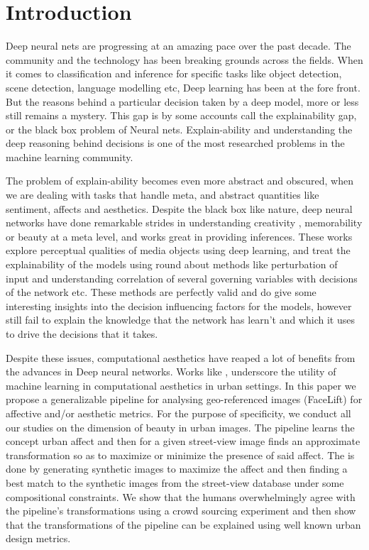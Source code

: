 \section{Introduction}

Deep neural nets are progressing at an amazing pace over the past decade. The community and the technology has been breaking grounds across the fields. 
When it comes to classification and inference for specific tasks like object detection, scene detection, language modelling etc, Deep learning has been at the fore front. 
But the  reasons behind a particular decision taken by a deep model, more or less still remains a mystery. This gap is by some accounts call the explainability gap, or the black box problem of Neural nets. 
Explain-ability and understanding the deep reasoning behind decisions is one of the most researched problems in the machine learning community.
\par
The problem of explain-ability becomes even more abstract and obscured, when we are dealing with tasks that handle meta, and abstract quantities like sentiment, affects and aesthetics. Despite the black box like nature, deep neural networks have done remarkable strides in understanding creativity \cite{redi20146}, memorability \cite{Isola2011} or beauty \cite{schifanella2015image} at a meta level, and works great in providing inferences. 
These works explore perceptual qualities of media objects using deep learning, and treat the explainability of the models using round about methods like perturbation 
of input and understanding correlation of several governing variables with decisions of the network etc. 
These methods are perfectly valid and do give some interesting insights into the decision influencing factors for the models, however still fail to explain the knowledge that the network has learn't and which it uses to drive the decisions that it takes. 
\par 
Despite these issues, computational aesthetics have reaped a lot of benefits from the advances in Deep neural networks. Works like \cite{khosla2014makes} \cite{quercia2014aesthetic} \cite{naik2014streetscore} \cite{parislooklikeparis}, underscore the utility of machine learning in computational aesthetics in urban settings.   In this paper we propose a generalizable pipeline for analysing geo-referenced images (FaceLift) for affective and/or aesthetic metrics. For the purpose of specificity, we conduct all our studies on the dimension of beauty in urban images. The pipeline learns the concept urban affect and then for a given street-view image finds an approximate transformation so as to maximize or minimize the presence of said affect. The is done by generating synthetic images to maximize the affect and then finding a best match to the synthetic images from the street-view database under some compositional constraints. We show that the humans overwhelmingly agree with the pipeline's transformations using a crowd sourcing experiment and then show that the transformations of the pipeline can be explained using well known urban design metrics.